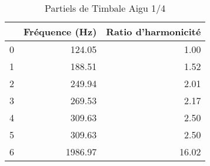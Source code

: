 \begin{table}
\centering
\caption{Partiels de Timbale Aigu 1/4}
\label{table:partiels-timbale-aigu-1.wav}
\begin{tabular}{lrr}
\toprule
{} &  Fréquence (Hz) &  Ratio d'harmonicité \\
\midrule
0 &          124.05 &                 1.00 \\
1 &          188.51 &                 1.52 \\
2 &          249.94 &                 2.01 \\
3 &          269.53 &                 2.17 \\
4 &          309.63 &                 2.50 \\
5 &          309.63 &                 2.50 \\
6 &         1986.97 &                16.02 \\
\bottomrule
\end{tabular}
\end{table}
